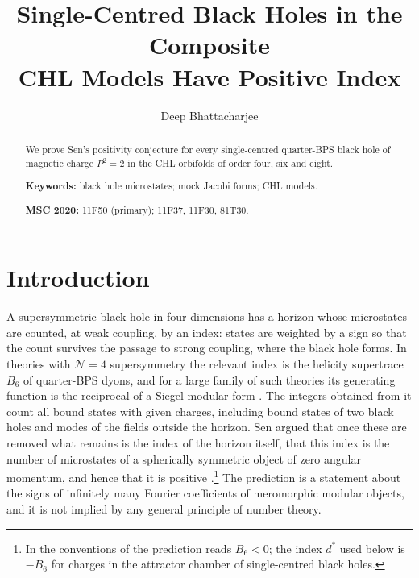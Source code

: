 \documentclass[11pt]{amsart}
\theoremstyle{definition}
\begin{document}
\title[Positive index in the composite CHL models]{Single-Centred Black Holes in the Composite\\ CHL Models Have Positive Index}

\author{Deep Bhattacharjee}
\address{Formerly, Electro-Gravitational Space Propulsion Laboratory (EGSPL), Bhubaneswar, Odisha 751030, India}
\address{Formerly, University of Calcutta (Heramba Chandra College), 23/49 Gariahat Road, Golpark, Kolkata 700029, West Bengal, India}

\begin{abstract}
We prove Sen's positivity conjecture for every single-centred quarter-BPS black hole of magnetic charge $P^2=2$ in the CHL orbifolds of order four, six and eight.

\medskip\noindent\textbf{Keywords:} black hole microstates; mock Jacobi forms; CHL models.

\smallskip\noindent\textbf{MSC 2020:} 11F50 (primary); 11F37, 11F30, 81T30.
\end{abstract}

\maketitle

\section{Introduction}\label{sec:intro}

A supersymmetric black hole in four dimensions has a horizon whose microstates are counted, at weak coupling, by an index: states are weighted by a sign so that the count survives the passage to strong coupling, where the black hole forms. In theories with $\mathcal N=4$ supersymmetry the relevant index is the helicity supertrace $B_6$ of quarter-BPS dyons, and for a large family of such theories its generating function is the reciprocal of a Siegel modular form \cite{DVV97,JS06,DJS06,DJS07}. The integers obtained from it count all bound states with given charges, including bound states of two black holes and modes of the fields outside the horizon. Sen argued that once these are removed what remains is the index of the horizon itself, that this index is the number of microstates of a spherically symmetric object of zero angular momentum, and hence that it is positive \cite{Sen11,BMS09}.\footnote{In the conventions of \cite{Sen11} the prediction reads $B_6<0$; the index $d^*$ used below is $-B_6$ for charges in the attractor chamber of single-centred black holes.} The prediction is a statement about the signs of infinitely many Fourier coefficients of meromorphic modular objects, and it is not implied by any general principle of number theory.
\end{document}
